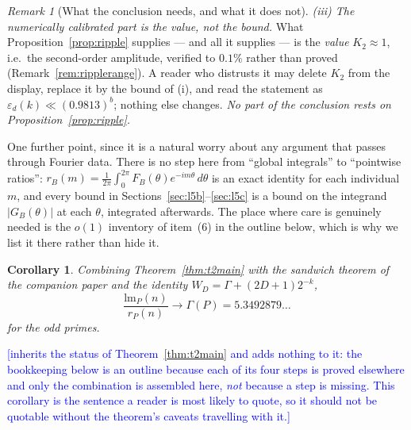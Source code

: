 \documentclass[11pt,a4paper]{article}
\theoremstyle{plain}
\newtheorem{corollary}[theorem]{Corollary}
\theoremstyle{definition}
\theoremstyle{remark}
\newtheorem{remark}[theorem]{Remark}
\newcommand{\STATUS}[1]{\textcolor{blue}{\textsf{[#1]}}}
\begin{document}
\begin{remark}[What the conclusion needs, and what it does not]
\emph{(iii) The numerically calibrated part is the value, not the bound.} What
Proposition~\ref{prop:ripple} supplies --- and all it supplies --- is the
\emph{value} $K_2\approx1$, i.e.\ the second-order amplitude, verified to
$0.1\%$ rather than proved (Remark~\ref{rem:ripplerange}). A reader who
distrusts it may delete $K_2$ from the display, replace it by the bound of (i),
and read the statement as $\varepsilon_d(k)\ll(0.9813)^{b}$; nothing else
changes. \emph{No part of the conclusion rests on
Proposition~\ref{prop:ripple}.}

One further point, since it is a natural worry about any argument that passes
through Fourier data. There is no step here from ``global integrals'' to
``pointwise ratios'': $r_B(m)=\frac1{2\pi}\int_0^{2\pi}F_B(\theta)e^{-im\theta}
\,d\theta$ is an exact identity for each individual $m$, and every bound in
Sections~\ref{sec:l5b}--\ref{sec:l5c} is a bound on the integrand $|G_B(\theta)|$
at each $\theta$, integrated afterwards. The place where care is genuinely
needed is the $o(1)$ inventory of item~(6) in the outline below, which is why we
list it there rather than hide it.
\end{remark}

\begin{corollary}\label{cor:goal}
Combining Theorem~\ref{thm:t2main} with the sandwich theorem of the companion
paper and the identity $W_D=\Gamma+(2D+1)2^{-k}$,
\[
  \frac{\mathrm{lm}_{P}(n)}{r_{P}(n)}\longrightarrow\Gamma(P)=5.3492879\ldots
\]
for the odd primes.
\end{corollary}

\STATUS{inherits the status of Theorem~\ref{thm:t2main} and adds nothing to it: the bookkeeping
below is an outline because each of its four steps is proved elsewhere and only the combination
is assembled here, \emph{not} because a step is missing. This corollary is the sentence a
reader is most likely to quote, so it should not be quotable without the theorem's caveats
travelling with it.}
\end{document}
